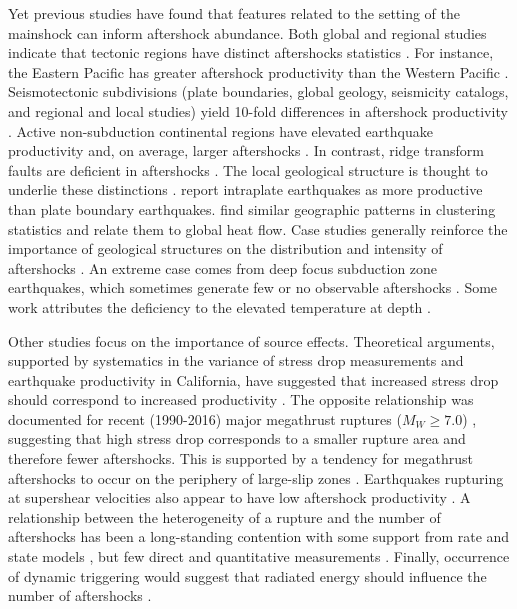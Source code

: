 \documentclass[draft, jgrga]{agujournal2018}
\begin{document}
Yet previous studies have found that features related to the setting of the mainshock can inform aftershock abundance. Both global and regional studies indicate that tectonic regions have distinct aftershocks statistics \citep{Chu2011, Page, Davidsen2015GeneralizedCalifornia, Tahir2014Aftershock2005, ogata2017statistics}. For instance, the Eastern Pacific has greater aftershock productivity than the Western Pacific \citep{Singh1911, Wetzler2016}. Seismotectonic subdivisions (plate boundaries, global geology, seismicity catalogs, and regional and local studies) yield 10-fold differences in aftershock productivity \citep{Page}. Active non-subduction continental regions have elevated earthquake productivity and, on average, larger aftershocks \citep{Page, Mogi1967, Davis1991Single-linkVariations}. In contrast, ridge transform faults are deficient in aftershocks \citep{Davis1991Single-linkVariations, Boettcher2004EarthquakeFaults, McGuire2005}. The local geological structure is thought to underlie these distinctions \citep{Boettcher2004EarthquakeFaults, McCloskey2003StructuralAftershocks}. \citet{Yamanaka1990scalingshock} report intraplate earthquakes as more productive than plate boundary earthquakes. \citet{Zaliapin2016AClusters} find similar geographic patterns in clustering statistics and relate them to global heat flow. Case studies generally reinforce the importance of geological structures on the distribution and intensity of aftershocks \citep{Das2003SpatialDistribution, McCloskey2003StructuralAftershocks}. An extreme case comes from deep focus subduction zone earthquakes, which sometimes generate few or no observable aftershocks \citep{Bath1965LateralMantle, Frohlich1989TheEarthquakes, Nyffenegger2000, Wiens1997AftershockZone, Wu1999, Houston2004}. Some work attributes the deficiency to the elevated temperature at depth \citep{Nyffenegger2000, Houston2004}.

Other studies focus on the importance of source effects. Theoretical arguments, supported by systematics in the variance of stress drop measurements and earthquake productivity in California, have suggested that increased stress drop should correspond to increased productivity \citep{Marsan2017HowAftershocks}. The opposite relationship was documented for recent (1990-2016) major megathrust ruptures ($M_W \ge 7.0$) \citep{Wetzler2016}, suggesting that high stress drop corresponds to a smaller rupture area and therefore fewer aftershocks. This is supported by a tendency for megathrust aftershocks to occur on the periphery of large-slip zones \citep{Wetzler2016, VanDerElst2015LargerAftershocks}. Earthquakes rupturing at supershear velocities also appear to have low aftershock productivity \citep{Bouchon2008TheEarthquakes}. A relationship between the heterogeneity of a rupture and the number of aftershocks has been a long-standing contention \citep{Mogi1967, Yamanaka1990scalingshock} with some support from rate and state models \citep{Helmstetter2006RelationModel, Marsan2006}, but few direct and quantitative measurements \citep{Das2003SpatialDistribution, Houston2004}. Finally, occurrence of dynamic triggering would suggest that radiated energy should influence the number of aftershocks \citep{felzer2006decay}.
\end{document}
